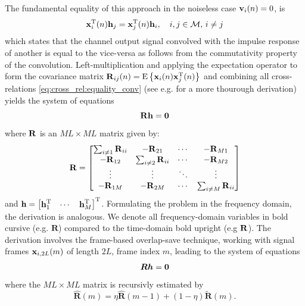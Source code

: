 \documentclass{article}
\newcommand{\h}{\mtxb{h}}
\newcommand{\x}{\mtxb{x}}
\newcommand{\R}{\mtxb{R}}
\newcommand{\hf}{{\bm{h}}}
\newcommand{\Rf}{{\bm{{R}}}}
\newcommand{\Mset}{\mathcal{M}}
\begin{document}
The fundamental equality of this approach in the noiseless case \(\bm{\mathrm{v}}_i(n) = 0\), is 
\begin{equation}
    \x_i^{\T}(n) \h_j = \x_j^{\T}(n) \h_i,\quad i,j \in \Mset,\,i\neq j\label{eq:cross_rel:equality_conv}
\end{equation}
which states that the channel output signal convolved with the impulse response of another is equal to the vice-versa as follows from the commutativity property of the convolution.
Left-multiplication and applying the expectation operator to form the covariance matrix \(\R_{ij}(n) = \ev{\x_i(n) \x_j^\T(n)}\) and combining all cross-relations \eqref{eq:cross_rel:equality_conv} (see e.g. \cite{huangAdaptiveMultichannelLeast2002} for a more thourough derivation) yields the system of equations  
\begin{equation}
    \R \h = \bm{0} \label{eq:cross_rel:null_space}\\
\end{equation}
where \(\R\) is an \(M L \times M L\) matrix given by:
\begin{equation}
    \R = \begin{bmatrix}
        \sum_{i \neq 1} \R_{ii} & -\R_{21} & \cdots & -\R_{M1}\\
        -\R_{12} & \sum_{i \neq 2} \R_{ii} & \cdots & -\R_{M2}\\
        \vdots & \vdots & \ddots & \vdots\\
        -\R_{1M} & -\R_{2M} & \cdots & \sum_{i \neq M} \R_{ii}\\
    \end{bmatrix}\label{eq:cross_rel:data_matrix}
\end{equation}
and \(\h = \begin{bmatrix}
    \h_1^\T & \cdots & \h_M^\T
\end{bmatrix}^\T\).
Formulating the problem in the frequency domain, the derivation is analogous. We denote all frequency-domain variables in bold cursive (e.g. \(\Rf\)) compared to the time-domain bold upright (e.g \(\R\)). The derivation involves the frame-based overlap-save technique, working with signal frames \(\x_{i,2L}(m)\) of length \(2L\), frame index \(m\), leading to the system of equations 
\begin{equation}
    \Rf \hf = \bm{0} \label{eq:frequency_domain:null_space}\\
\end{equation}
where the \(M L \times M L\) matrix is recursivly estimated by \begin{equation}
    \hat{\Rf}(m) = \eta \hat{\Rf}(m-1) + (1-\eta )\tilde{\Rf}(m).
\end{equation}
\end{document}
